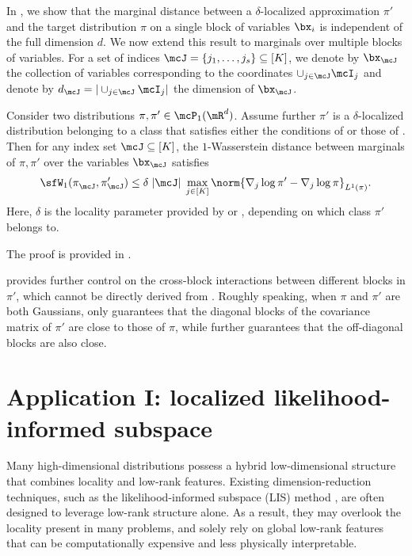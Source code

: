 \documentclass[11pt]{article}
\begin{document}
In , we show that the marginal distance between a $\delta$-localized approximation $\pi'$ and the target distribution $\pi$ on a single block of variables $\bx_i$ is independent of the full dimension $d$.
%
We now extend this result to marginals over multiple blocks of variables. 
For a set of indices $\mcJ = \{j_1, \ldots, j_s\} \subseteq [K]$, we denote by $\bx_\mcJ$ the collection of variables corresponding to the coordinates $\cup_{j \in \mcJ} \mcI_{j}$ and denote by $d_\mcJ = |\cup_{j \in \mcJ} \mcI_{j}|$ the dimension of $\bx_\mcJ$.

\begin{thm}
\label{thm:margin_multi}
Consider two distributions $\pi, \pi' \in \mcP_1(\mR^d)$. Assume further $\pi'$ is a $\delta$-localized distribution belonging to a class that satisfies either the conditions of  or those of .
%
Then for any index set $\mcJ\subseteq [K]$, the $1$-Wasserstein distance between marginals of $\pi,\pi'$ over the variables $\bx_\mcJ$ satisfies 
\begin{equation}
    \sfW_1 (\pi_\mcJ^{}, \pi_\mcJ') \le \delta \; |\mcJ| \; \max_{j\in [K]} \norm{ \nabla_j \log \pi' - \nabla_j \log \pi }_{L^1(\pi)}.
\end{equation}
Here, $\delta$ is the locality parameter provided by  or , depending on which class $\pi'$ belongs to.
\end{thm}

\noindent The proof is provided in .

 provides further control on the cross-block interactions between different blocks in $\pi'$, which cannot be directly derived from .
%
Roughly speaking, when $\pi$ and $\pi'$ are both Gaussians,  only guarantees that the diagonal blocks of the covariance matrix of $\pi'$ are close to those of $\pi$, while  further guarantees that the off-diagonal blocks are also close. 





\section{Application I: localized likelihood-informed subspace}
\label{sec:LLIS}

Many high-dimensional distributions possess a hybrid low-dimensional structure that combines locality and low-rank features.
%
Existing dimension-reduction techniques, such as the likelihood-informed subspace (LIS) method \cite{MR3274599,MR3543164,MR4435948}, are often designed to leverage low-rank structure alone.
%
As a result, they may overlook the locality present in many problems, and solely rely on global low-rank features that can be computationally expensive and less physically interpretable.
\end{document}

